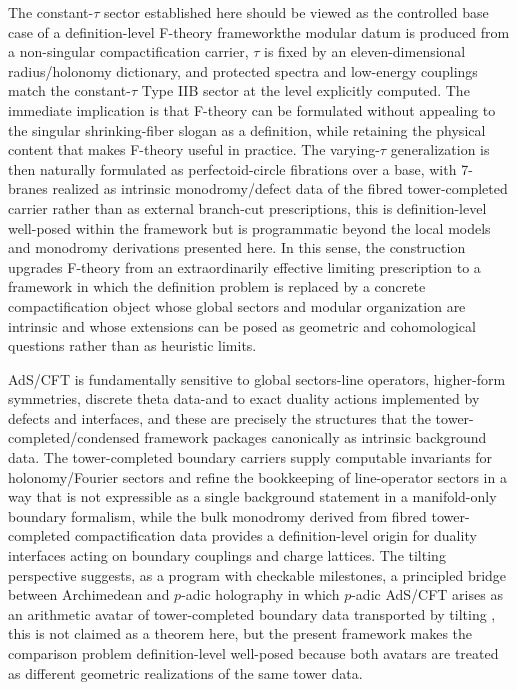 \documentclass[11pt]{article}
\theoremstyle{remark}
\begin{document}
The constant-\(\tau\) sector established here should be viewed as the controlled base case of a definition-level F-theory framework\:the modular datum is produced from a non-singular compactification carrier, \(\tau\) is fixed by an eleven-dimensional radius/holonomy dictionary, and protected spectra and low-energy couplings match the constant-\(\tau\) Type IIB sector at the level explicitly computed. The immediate implication is that F-theory can be formulated without appealing to the singular shrinking-fiber slogan as a definition, while retaining the physical content that makes F-theory useful in practice. The varying-\(\tau\) generalization is then naturally formulated as perfectoid-circle fibrations over a base, with 7-branes realized as intrinsic monodromy/defect data of the fibred tower-completed carrier rather than as external branch-cut prescriptions, this is definition-level well-posed within the framework but is programmatic beyond the local models and monodromy derivations presented here. In this sense, the construction upgrades F-theory from an extraordinarily effective limiting prescription to a framework in which the definition problem is replaced by a concrete compactification object whose global sectors and modular organization are intrinsic and whose extensions can be posed as geometric and cohomological questions rather than as heuristic limits.

AdS/CFT is fundamentally sensitive to global sectors-line operators, higher-form symmetries, discrete theta data-and to exact duality actions implemented by defects and interfaces, and these are precisely the structures that the tower-completed/condensed framework packages canonically as intrinsic background data. The tower-completed boundary carriers supply computable invariants for holonomy/Fourier sectors and refine the bookkeeping of line-operator sectors in a way that is not expressible as a single background statement in a manifold-only boundary formalism, while the bulk monodromy derived from fibred tower-completed compactification data provides a definition-level origin for duality interfaces acting on boundary couplings and charge lattices. The tilting perspective suggests, as a program with checkable milestones, a principled bridge between Archimedean and \(p\)-adic holography in which \(p\)-adic AdS/CFT arises as an arithmetic avatar of tower-completed boundary data transported by tilting \cite{Gubser2017, Heydeman2018}, this is not claimed as a theorem here, but the present framework makes the comparison problem definition-level well-posed because both avatars are treated as different geometric realizations of the same tower data.
\end{document}
